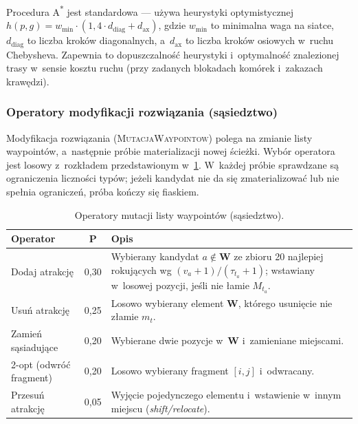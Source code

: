 Procedura A\textsuperscript{*} jest standardowa --- używa heurystyki
optymistycznej $h(p, g) = w_{\min} \cdot (1{,}4\cdot d_{\mathrm{diag}} +
d_{\mathrm{ax}})$, gdzie $w_{\min}$ to minimalna waga na siatce,
$d_{\mathrm{diag}}$ to liczba kroków diagonalnych, a~$d_{\mathrm{ax}}$ to
liczba kroków osiowych w~ruchu Chebysheva. Zapewnia to dopuszczalność
heurystyki i~optymalność znalezionej trasy w~sensie kosztu ruchu (przy
zadanych blokadach komórek i~zakazach krawędzi).

\subsubsection{Operatory modyfikacji rozwiązania (sąsiedztwo)}
\label{sec:operators}

Modyfikacja rozwiązania (\textsc{MutacjaWaypointow}) polega na zmianie
listy waypointów, a~następnie próbie materializacji nowej ścieżki.
Wybór operatora jest losowy z~rozkładem przedstawionym
w~\cref{tab:operators}. W~każdej próbie sprawdzane są ograniczenia
liczności typów; jeżeli kandydat nie da się zmaterializować lub nie spełnia
ograniczeń, próba kończy się fiaskiem.

\begin{table}[H]
\centering
\caption{Operatory mutacji listy waypointów (sąsiedztwo).}
\label{tab:operators}
\begin{tabular}{p{3.3cm} c p{8.3cm}}
\toprule
\textbf{Operator} & \textbf{P} & \textbf{Opis} \\
\midrule
Dodaj atrakcję      & 0{,}30 & Wybierany kandydat $a \notin \mathbf{W}$
                                ze zbioru 20 najlepiej rokujących wg
                                $(v_a + 1) / (\tau_{t_a} + 1)$; wstawiany
                                w~losowej pozycji, jeśli nie łamie $M_{t_a}$. \\
Usuń atrakcję       & 0{,}25 & Losowo wybierany element $\mathbf{W}$, którego
                                usunięcie nie złamie $m_{t}$. \\
Zamień sąsiadujące  & 0{,}20 & Wybierane dwie pozycje w~$\mathbf{W}$
                                i~zamieniane miejscami. \\
2-opt (odwróć fragment) & 0{,}20 & Losowo wybierany fragment $[i, j]$
                                i~odwracany. \\
Przesuń atrakcję    & 0{,}05 & Wyjęcie pojedynczego elementu i~wstawienie
                                w~innym miejscu (\emph{shift/relocate}). \\
\bottomrule
\end{tabular}
\end{table}

